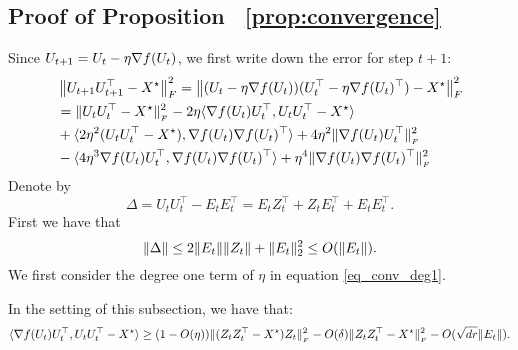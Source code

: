 \subsection{Proof of Proposition ~\ref{prop:convergence}}\label{sec:prop:convergence}
	Since $U_{t+1} = U_t - \eta \nabla f(U_t)$, we first write down the error for step $t+1$:
	\begin{align}
		& \left\|U_{t+1}U_{t+1}^{\top} - {X}^\star\right\|_{F}^2
		= \left\|(U_t - \eta \nabla f(U_t)) (U_t^{\top} - \eta \nabla f(U_t)^{\top}) - {X}^\star\right\|_{F}^2 \nonumber \\
		& = \|U_t U_t^{\top} - {X}^\star\|_{_{F}}^2 - 2\eta \langle\nabla f(U_t) U_t^{\top}, U_t U_t^{\top} - {X}^\star\rangle \label{eq_conv_deg1} \\
		& + \langle2\eta^2 (U_tU_t^{\top} - {X}^\star), \nabla f(U_t)\nabla f(U_t)^{\top}\rangle + 4\eta^2 \|\nabla f(U_t)U_t^{\top}\|_{_{F}}^2 \label{eq_conv_deg2} \\
		& - \langle4\eta^3 \nabla f(U_t) U_t^{\top}, \nabla f(U_t)\nabla f(U_t)^{\top}\rangle
		+ \eta^4 \|\nabla f(U_t)\nabla f(U_t)^{\top}\|_{_{F}}^2 \label{eq_conv_deg3}
	\end{align}
	Denote by
	\[ \Delta = U_tU_t^{\top} - E_tE_t^{\top} = E_t Z_t^{\top} + Z_t E_t^{\top} + E_tE_t^{\top}. \]
	First we have that
	\[ \left\|\Delta\right\| \leq 2 \| E_t \| \| Z_t \| + \| E_t \|_2^2  \le O(\left\|E_t\right\|). \]
	We first consider the degree one term of $\eta$ in equation \eqref{eq_conv_deg1}.
	\begin{claim}\label{claim_conv_deg1}
		In the setting of this subsection, we have that:
		\[ \langle\nabla f(U_t)U_t^{\top}, U_tU_t^{\top} - {X}^\star\rangle
		\ge (1 - O(\eta)) \|(Z_tZ_t^{\top} - {X}^\star)Z_t\|_{_{F}}^2
		- O(\delta) \|Z_tZ_t^{\top} - {X}^\star\|_{_{F}}^2  - O(\sqrt{dr} \|E_t\|). \]
	\end{claim}
